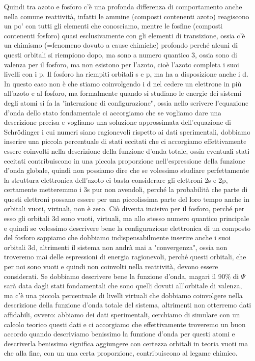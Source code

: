 Quindi tra azoto e fosforo c'è una profonda differenza di comportamento anche nella comune reattività, infatti le ammine (composti contenenti azoto) reagiscono un po' con tutti gli elementi che conosciamo, mentre le fosfine (composti contenenti fosforo) quasi esclusivamente con gli elementi di transizione, ossia c'è un chimismo (=fenomeno dovuto a cause chimiche) profondo perché alcuni di questi orbitali si riempiono dopo, ma sono a numero quantico 3, ossia sono di valenza per il fosforo, ma non esistono per l'azoto, cioè l'azoto completa i suoi livelli con i p. Il fosforo ha riempiti orbitali s e p, ma ha a disposizione anche i d. In questo caso non è che stiamo coinvolgendo i d nel cedere un elettrone in più all'azoto e al fosforo, ma formalmente quando si studiano le energie dei sistemi degli atomi si fa la "interazione di configurazione", ossia nello scrivere l'equazione d'onda dello stato fondamentale ci accorgiamo che se vogliamo dare una descrizione precisa e vogliamo una soluzione approssimata dell'equazione di Schrödinger i cui numeri siano ragionevoli rispetto ai dati sperimentali, dobbiamo inserire una piccola percentuale di stati eccitati che ci accorgiamo effettivamente essere coinvolti nella descrizione della funzione d'onda totale, ossia eventuali stati eccitati contribuiscono in una piccola proporzione nell'espressione della funzione d'onda globale, quindi non possiamo dire che se volessimo studiare perfettamente la struttura elettronica dell'azoto ci basta considerare gli elettroni 2s e 2p, certamente metteremmo i 3s pur non avendoli, perché la probabilità che parte di questi elettroni possano essere per una piccolissima parte del loro tempo anche in orbitali vuoti, virtuali, non è zero. Ciò diventa incisivo per il fosforo, perché per esso gli orbitali 3d sono vuoti, virtuali, ma allo stesso numero quantico principale e quindi se volessimo descrivere bene la configurazione elettronica di un composto del fosforo sappiamo che dobbiamo indispensabilmente inserire anche i suoi orbitali 3d, altrimenti il sistema non andrà mai a "convergenza", ossia non troveremo mai delle espressioni di energia ragionevoli, perché questi orbitali, che per noi sono vuoti e quindi non coinvolti nella reattività, devono essere considerati. Se dobbiamo descrivere bene la funzione d'onda, magari il 90\% di $\Psi$ sarà data dagli stati fondamentali che sono quelli dovuti all'orbitale di valenza, ma c'è una piccola percentuale di livelli virtuali che dobbiamo coinvolgere nella descrizione della funzione d'onda totale del sistema, altrimenti non otterremo dati affidabili, ovvero: abbiamo dei dati sperimentali, cerchiamo di simulare con un calcolo teorico questi dati e ci accorgiamo che effettivamente troveremo un buon accordo quando descriviamo benissimo la funzione d'onda per questi atomi e descriverla benissimo significa aggiungere con certezza orbitali in teoria vuoti ma che alla fine, con un una certa proporzione, contribuiscono al legame chimico.

